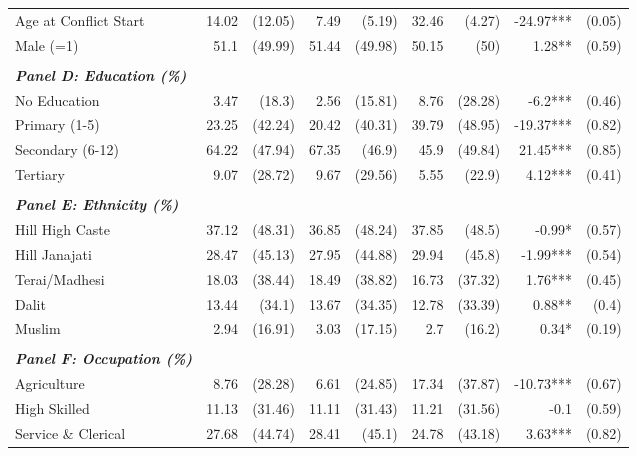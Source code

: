 \begin{landscape}
\begin{table}[!h]
{\begin{tabular}[t]{lrrrrrrrr}
Age at Conflict Start & 14.02 & (12.05) & 7.49 & (5.19) & 32.46 & (4.27) & -24.97*** & (0.05)\\
\addlinespace
Male (=1) & 51.1 & (49.99) & 51.44 & (49.98) & 50.15 & (50) & 1.28** & (0.59)\\
 &  &  &  &  &  &  &  & \\
\em{\textbf{Panel D: Education (\%)}} & \em{\textbf{}} & \em{\textbf{}} & \em{\textbf{}} & \em{\textbf{}} & \em{\textbf{}} & \em{\textbf{}} & \em{\textbf{}} & \em{\textbf{}}\\
No Education & 3.47 & (18.3) & 2.56 & (15.81) & 8.76 & (28.28) & -6.2*** & (0.46)\\
Primary (1-5) & 23.25 & (42.24) & 20.42 & (40.31) & 39.79 & (48.95) & -19.37*** & (0.82)\\
\addlinespace
Secondary (6-12) & 64.22 & (47.94) & 67.35 & (46.9) & 45.9 & (49.84) & 21.45*** & (0.85)\\
Tertiary & 9.07 & (28.72) & 9.67 & (29.56) & 5.55 & (22.9) & 4.12*** & (0.41)\\
 &  &  &  &  &  &  &  & \\
\em{\textbf{Panel E: Ethnicity (\%)}} & \em{\textbf{}} & \em{\textbf{}} & \em{\textbf{}} & \em{\textbf{}} & \em{\textbf{}} & \em{\textbf{}} & \em{\textbf{}} & \em{\textbf{}}\\
Hill High Caste & 37.12 & (48.31) & 36.85 & (48.24) & 37.85 & (48.5) & -0.99* & (0.57)\\
\addlinespace
Hill Janajati & 28.47 & (45.13) & 27.95 & (44.88) & 29.94 & (45.8) & -1.99*** & (0.54)\\
Terai/Madhesi & 18.03 & (38.44) & 18.49 & (38.82) & 16.73 & (37.32) & 1.76*** & (0.45)\\
Dalit & 13.44 & (34.1) & 13.67 & (34.35) & 12.78 & (33.39) & 0.88** & (0.4)\\
Muslim & 2.94 & (16.91) & 3.03 & (17.15) & 2.7 & (16.2) & 0.34* & (0.19)\\
 &  &  &  &  &  &  &  & \\
\addlinespace
\em{\textbf{Panel F: Occupation (\%)}} & \em{\textbf{}} & \em{\textbf{}} & \em{\textbf{}} & \em{\textbf{}} & \em{\textbf{}} & \em{\textbf{}} & \em{\textbf{}} & \em{\textbf{}}\\
Agriculture & 8.76 & (28.28) & 6.61 & (24.85) & 17.34 & (37.87) & -10.73*** & (0.67)\\
High Skilled & 11.13 & (31.46) & 11.11 & (31.43) & 11.21 & (31.56) & -0.1 & (0.59)\\
Service \& Clerical & 27.68 & (44.74) & 28.41 & (45.1) & 24.78 & (43.18) & 3.63*** & (0.82)\\

\end{tabular}}
\end{table}
\end{landscape}
